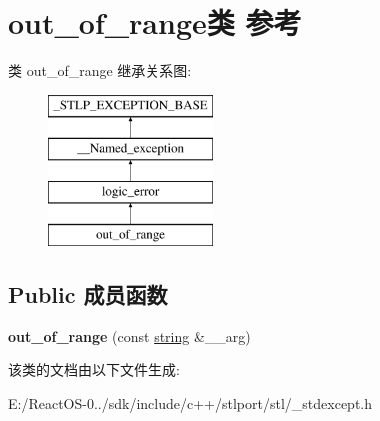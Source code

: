 \hypertarget{classout__of__range}{}\section{out\+\_\+of\+\_\+range类 参考}
\label{classout__of__range}
类 out\+\_\+of\+\_\+range 继承关系图\+:\begin{figure}[H]
\begin{center}
\leavevmode
\includegraphics[height=4.000000cm]{classout__of__range}
\end{center}
\end{figure}
\subsection*{Public 成员函数}
\begin{DoxyCompactItemize}
\item 
\mbox{\label{classout__of__range_ae9427132287199f1223124c27babf725}} 
{\bfseries out\+\_\+of\+\_\+range} (const \hyperlink{structstring}{string} \&\+\_\+\+\_\+arg)
\end{DoxyCompactItemize}


该类的文档由以下文件生成\+:\begin{DoxyCompactItemize}
\item 
E\+:/\+React\+O\+S-\/0../sdk/include/c++/stlport/stl/\+\_\+stdexcept.\+h\end{DoxyCompactItemize}
